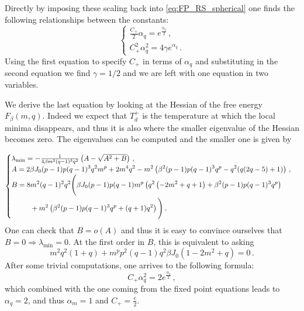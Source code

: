 \documentclass[superscriptaddress,amsmath, amssymb, onecolumn, pra]{revtex4-2}
\begin{document}
Directly by imposing these scaling back into \eqref{eq:FP_RS_spherical} one finds the following relationships between the constants:
\begin{equation}
    \begin{cases}
        \frac{C_+}{2}\alpha_q = e^{\frac{\alpha_q}{2}}\,, \\
        C_+^2\alpha_q^2 = 4\gamma e^{\alpha_q}\,.
    \end{cases}
\end{equation}
Using the first equation to specify $C_+$ in terms of $\alpha_q$ and substituting in the second equation we find $\gamma = 1/2$ and we are left with one equation in two variables.

We derive the last equation by looking at the Hessian of the free energy $F_{\beta}(m,q)$. Indeed we expect that $T_d^+$ is the temperature at which the local minima disappears, and thus it is also where the smaller eigenvalue of the Hessian becomes zero. 
The eigenvalues can be computed and the smaller one is given by

\begin{equation}
    \begin{cases}
        \lambda_{\rm min} = -\frac{1}{4 \beta  m^2 (q-1)^3 q^2}\left(A - \sqrt{A^2 + B}\right)\,, \\
        \begin{aligned}
        A = 2 \beta  J_0 (p-1) p (q-1)^3 q^2 m^p+2 m^4 q^2 -m^2 \left(\beta ^2 (p-1) p (q-1)^3 q^p- q^2 (q (2 q-5)+1)\right) \,, 
        \end{aligned}\\
        \begin{aligned}
        B = 8&m^2 (q-1)^2 q^2 \Bigg(\beta  J_0 (p-1) p (q-1) m^p \left( q^2 \left(-2 m^2+q+1\right)+\beta ^2 (p-1) p (q-1)^3
   q^p\right)\\ &+m^2 \left(\beta ^2 (p-1) p (q-1)^3 q^p+ (q+1) q^2\right)\Bigg)\,.
        \end{aligned}
    \end{cases}
\end{equation}
One can check that $B = o(A)$ and thus it is easy to convince ourselves that $B = 0 \Rightarrow\lambda_{\min} = 0$. At the first order in $B$, this is equivalent to asking 
\begin{equation}
    m^2q^2(1+q) + m^pp^2(q-1)q^2\beta J_0(1-2m^2 + q) = 0 \,.
\end{equation}
After some trivial computations, one arrives to the following formula:
\begin{equation}
    C_+\alpha_q^2 = 2e^{\frac{\alpha_q}{2}} \,,
\end{equation}
which combined with the one coming from the fixed point equations leads to $\alpha_q = 2$, and thus $\alpha_m=1$ and $C_+ = \frac{e}{2}$.
\end{document}

